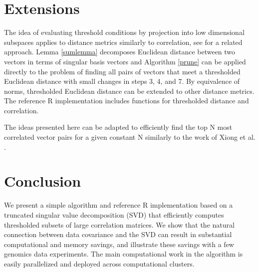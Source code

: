 \documentclass{article}
\let\proglang=\textsf
\numberwithin{algorithmctr}{section}
\begin{document}
\section{Extensions}\label{extensions}

The idea of evaluating threshold conditions by projection into low dimensional
subspaces applies to distance metrics similarly to correlation, see
\cite{svd-similarity} for a related approach. Lemma \ref{sumlemma} decomposes
Euclidean distance between two vectors in terms of singular basis vectors and
Algorithm \ref{prune} can be applied directly to the problem of finding all
pairs of vectors that meet a thresholded Euclidean distance with small changes
in steps 3, 4, and 7.  By equivalence of norms, thresholded Euclidean distance
can be extended to other distance metrics. The reference \proglang{R}
implementation \cite{sup} includes functions for thresholded distance and
correlation.

The ideas presented here can be adapted to efficiently find the top N most
correlated vector pairs for a given constant N similarly to the work of
Xiong et al. \cite{prune2}.

\section{Conclusion}\label{conclusion}

We present a simple algorithm and reference \proglang{R} implementation based
on a truncated singular value decomposition (SVD) that efficiently computes
thresholded subsets of large correlation  matrices.  We show that the natural
connection between data covariance and the SVD can result in substantial
computational and memory savings, and illustrate these savings with a few
genomics data experiments.  The main computational work in the algorithm is
easily parallelized and deployed across computational clusters.


{}

\end{document}
